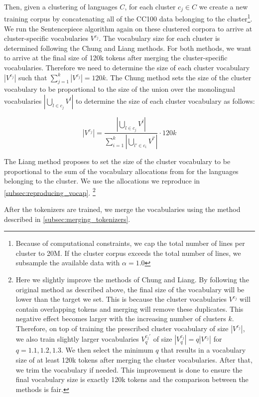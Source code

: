 Then, given a clustering of languages $C$, for each cluster $c_j \in C$ we create a new training corpus by concatenating all of the CC100 data belonging to the cluster\footnote{Because of computational constraints, we cap the total number of lines per cluster to 20M. If the cluster corpus exceeds the total number of lines, we subsample the available data with $\alpha=1.0$}. We run the Sentencepiece algorithm again on these clustered corpora to arrive at cluster-specific vocabularies $V^{c_j}$. The vocabulary size for each cluster is determined following the Chung and Liang methods. For both methods, we want to arrive at the final size of 120k tokens after merging the cluster-specific vocabularies. Therefore we need to determine the size of each cluster vocabulary $|V^{c_j}|$ such that $\sum_{j=1}^k |V^{c_j}| = 120k$. The Chung method sets the size of the cluster vocabulary to be proportional to the size of the union over the monolingual vocabularies $|\bigcup_{l \in c_j} V^l|$ to determine the size of each cluster vocabulary as follows:

\begin{equation}
    |V^{c_j}| = \frac{|\bigcup_{l \in c_j} V^l|}{\sum_{i=1}^k |\bigcup_{l' \in c_i} V^{l'}|} \cdot 120k
\end{equation}

The Liang method proposes to set the size of the cluster vocabulary to be proportional to the sum of the vocabulary allocations from \citet{zheng_allocating_2021} for the languages belonging to the cluster. We use the allocations we reproduce in \autoref{subsec:reproducing_vocap}.
\footnote{
    Here we slightly improve the methods of Chung and Liang. By following the original method as described above, the final size of the vocabulary will be lower than the target we set. This is because the cluster vocabularies $V^{c_j}$ will contain overlapping tokens and merging will remove these duplicates. This negative effect becomes larger with the increasing number of clusters $k$. Therefore, on top of training the prescribed cluster vocabulary of size $|V^{c_j}|$, we also train slightly larger vocabularies $V_q^{c_j'}$ of size $|V_q^{c_j}| = q|V^{c_j}|$ for $q = 1.1, 1.2, 1.3$. We then select the minimum $q$ that results in a vocabulary size of at least 120k tokens after merging the cluster vocabularies. After that, we trim the vocabulary if needed. This improvement is done to ensure the final vocabulary size is exactly 120k tokens and the comparison between the methods is fair.
}

After the tokenizers are trained, we merge the vocabularies using the method described in \autoref{subsec:merging_tokenizers}. 

